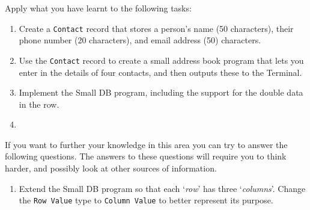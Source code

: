 \clearpage
Apply what you have learnt to the following tasks:

\begin{enumerate}
  \item Create a \texttt{Contact} record that stores a person's name (50 characters), their phone number (20 characters), and email address (50) characters. 
  \item Use the \texttt{Contact} record to create a small address book program that lets you enter in the details of four contacts, and then outputs these to the Terminal.
  \item Implement the Small DB program, including the support for the double data in the row.
  \item 
\end{enumerate}

\bigskip

If you want to further your knowledge in this area you can try to answer the following questions. The answers to these questions will require you to think harder, and possibly look at other sources of information.

\begin{enumerate}
  \item Extend the Small DB program so that each `\emph{row}' has three `\emph{columns}'. Change the \texttt{Row Value} type to \texttt{Column Value} to better represent its purpose.
\end{enumerate}